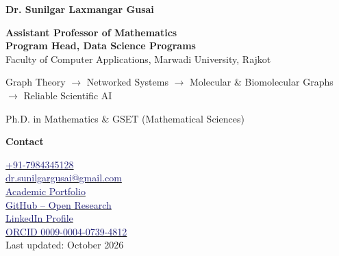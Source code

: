 \begin{minipage}[t]{0.70\textwidth}

{\LARGE \textbf{Dr. Sunilgar Laxmangar Gusai}}

\vspace{0.16cm}

{\large \textbf{Assistant Professor of Mathematics}} \\
{\large \textbf{Program Head, Data Science Programs}} \\
{\small Faculty of Computer Applications, Marwadi University, Rajkot}

\vspace{0.15cm}

{\small Graph Theory \(\rightarrow\) Networked Systems \(\rightarrow\) Molecular \& Biomolecular Graphs \(\rightarrow\) Reliable Scientific AI}

\vspace{0.20cm}

{\color{Maroon}
\faGraduationCap\quad Ph.D. in Mathematics \& GSET (Mathematical Sciences)}

\vspace{0.08cm}

{\color{Maroon}\textbf{Contact}}\\ \vspace{-.4cm}

\faWhatsapp\quad
\href{https://wa.me/917984345128}
{\textcolor{MidnightBlue}{+91-7984345128}} \\
\faEnvelope\quad
\href{mailto:dr.sunilgargusai@gmail.com}
{\textcolor{MidnightBlue}{dr.sunilgargusai@gmail.com}} \\
\faGlobe\quad \href{https://sunilgargusai.github.io/sunilgar-portfolio/}
{\textcolor{MidnightBlue}{Academic Portfolio}} \\
\faGithub\quad \href{https://github.com/SunilgarGusai}
{\textcolor{MidnightBlue}{GitHub -- Open Research}} \\
\faLinkedin\quad
\href{https://www.linkedin.com/in/dr-sunilgar-l-gusai-431a581a8/}
{\textcolor{MidnightBlue}{LinkedIn Profile}} \\
\faOrcid\quad
\href{https://orcid.org/0009-0004-0739-4812}
{\textcolor{MidnightBlue}{ORCID 0009-0004-0739-4812}} \\

\vspace{0.10cm}
{\scriptsize\color{gray}Last updated: October 2026}

\end{minipage}
\hfill
